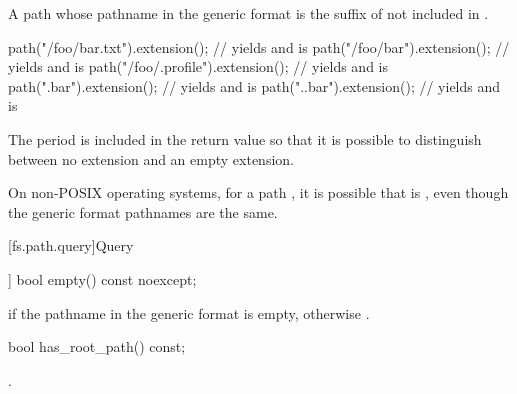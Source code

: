 \begin{itemdescr}
\pnum
\returns
A path whose pathname in the generic format is
the suffix of  not included in .

\pnum
\begin{example}
\begin{codeblock}
path("/foo/bar.txt").extension();       // yields  and  is 
path("/foo/bar").extension();           // yields  and  is 
path("/foo/.profile").extension();      // yields  and  is 
path(".bar").extension();               // yields  and  is 
path("..bar").extension();              // yields  and  is 
\end{codeblock}
\end{example}

\pnum
\begin{note}
The period is included in the return value so that it is
  possible to distinguish between no extension and an empty extension.
\end{note}

\pnum
\begin{note}
On non-POSIX operating systems, for a path ,
it is possible that  is ,
even though the generic format pathnames are the same.
\end{note}
\end{itemdescr}

[fs.path.query]{Query}

%
\begin{itemdecl}
[[nodiscard]] bool empty() const noexcept;
\end{itemdecl}

\begin{itemdescr}
\pnum
\returns
{} if the pathname in the generic format is empty, otherwise .
\end{itemdescr}

%
\begin{itemdecl}
bool has_root_path() const;
\end{itemdecl}

\begin{itemdescr}
\pnum
\returns
{}.
\end{itemdescr}

